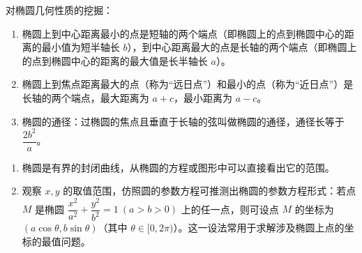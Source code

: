 \documentclass{article}
\begin{document}
 对椭圆几何性质的挖掘：

\begin{enumerate}
    \item 椭圆上到中心距离最小的点是短轴的两个端点（即椭圆上的点到椭圆中心的距离的最小值为短半轴长 \(b\)），到中心距离最大的点是长轴的两个端点（即椭圆上的点到椭圆中心的距离的最大值是长半轴长 \(a\)）。
    \item 椭圆上到焦点距离最大的点（称为“远日点”）和最小的点（称为“近日点”）是长轴的两个端点，最大距离为 \(a + c\)，最小距离为 \(a - c\)。
    \item 椭圆的通径：过椭圆的焦点且垂直于长轴的弦叫做椭圆的通径，通径长等于 \(\dfrac{2b^2}{a}\)。
\end{enumerate}


\begin{tcolorbox}[colback=blue!10,colframe=blue!70!black,title=椭圆的范围及参数方程]
\begin{enumerate}
    \item 椭圆是有界的封闭曲线，从椭圆的方程或图形中可以直接看出它的范围。
    \item 观察 \(x,y\) 的取值范围，仿照圆的参数方程可推测出椭圆的参数方程形式：若点 \(M\) 是椭圆 \(\dfrac{x^2}{a^2} + \dfrac{y^2}{b^2} = 1\ (a > b > 0)\) 上的任一点，则可设点 \(M\) 的坐标为 \((a\cos\theta, b\sin\theta)\)（其中 \(\theta \in [0, 2\pi)\)）。这一设法常用于求解涉及椭圆上点的坐标的最值问题。
\end{enumerate}
\end{tcolorbox}

\vspace{1em}
\end{document}
